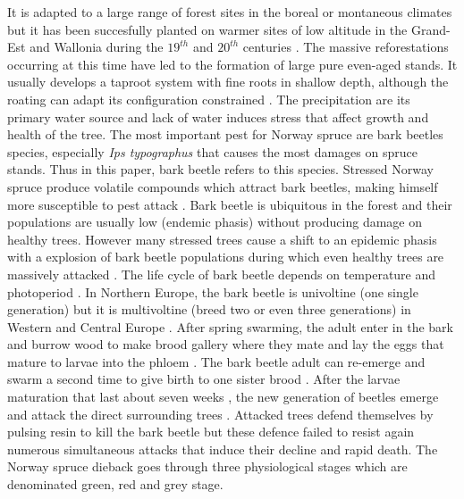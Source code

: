 \documentclass[3p,procedia]{elsarticle}
\begin{document}
It is adapted to a large range of forest sites in the boreal or montaneous climates but it has been succesfully planted on warmer sites of low altitude in the Grand-Est and Wallonia during the $19^{th}$ and $20^{th}$ centuries \citep{Noirfalise_1975,guinier_trois_1959}.
The massive reforestations occurring at this time have led to the formation of large pure even-aged stands.
It usually develops a taproot system with fine roots in shallow depth, although the roating can adapt its configuration constrained \citep{puhe_roots_2003,kostler_1968}.   
The precipitation are its primary water source \citep{tjoelker_outline_2007} and lack of water induces stress that affect growth and health of the tree. 
The most important pest for Norway spruce are bark beetles species, especially \textit{Ips typographus} that causes the most damages on spruce stands.
Thus in this paper, bark beetle refers to this species.
Stressed Norway spruce produce volatile compounds which attract bark beetles, making himself more susceptible to pest attack \citep{netherer_waterlimiting_2015,netherer_interactions_2021}.
Bark beetle is ubiquitous in the forest and their populations are usually low (endemic phasis) without producing damage on healthy trees. 
However many stressed trees  cause a shift to an epidemic phasis with a explosion of bark beetle populations during which even healthy trees are massively attacked \citep{kautz_individual_2014}.
The life cycle of bark beetle depends on temperature and photoperiod \citep{annila_influence_1969, baier_phenipscomprehensive_2007}.
In Northern Europe, the bark beetle is univoltine (one single generation) but it is multivoltine (breed two or even three generations) in Western and Central Europe \citep{annila_influence_1969}.
After spring swarming, the adult enter in the bark and burrow wood to make brood gallery where they mate and lay the eggs that mature to larvae into the phloem \citep{hlasny_bark_2021}.
The bark beetle adult can re-emerge and swarm a second time to give birth to one sister brood \citep{zolubas_1995}.
After the larvae maturation that last about seven weeks \citep{baier_phenipscomprehensive_2007}, the new generation of beetles emerge and attack the direct surrounding trees \citep{zolubas_1995}.
Attacked trees defend themselves by pulsing resin to kill the bark beetle but these defence failed to resist again numerous simultaneous attacks that induce their decline and rapid death.
The Norway spruce dieback goes through three physiological stages which are denominated green, red and grey stage.
\end{document}
